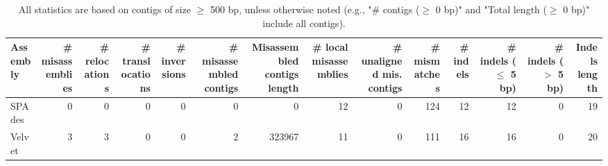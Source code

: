 \documentclass[12pt,a4paper]{article}
\begin{document}
\begin{table}[ht]
\begin{center}
\caption{All statistics are based on contigs of size $\geq$ 500 bp, unless otherwise noted (e.g., "\# contigs ($\geq$ 0 bp)" and "Total length ($\geq$ 0 bp)" include all contigs).}
\begin{tabular}{|l*{13}{|r}|}
\hline
Assembly & \# misassemblies &     \# relocations &     \# translocations &     \# inversions & \# misassembled contigs & Misassembled contigs length & \# local misassemblies & \# unaligned mis. contigs & \# mismatches & \# indels &     \# indels ($\leq$ 5 bp) &     \# indels ($>$ 5 bp) & Indels length \\ \hline
SPAdes & 0 & 0 & 0 & 0 & 0 & 0 & 12 & 0 & 124 & 12 & 12 & 0 & 19 \\ \hline
Velvet & 3 & 3 & 0 & 0 & 2 & 323967 & 11 & 0 & 111 & 16 & 16 & 0 & 20 \\ \hline
\end{tabular}
\end{center}
\end{table}
\end{document}
